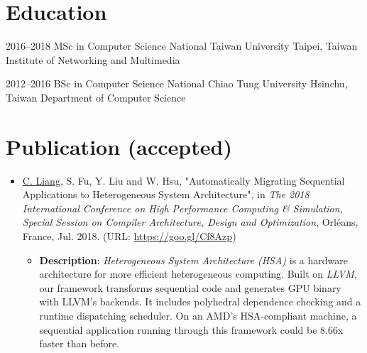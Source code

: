 \documentclass[11pt,a4paper,sans,english]{moderncv}
\begin{document}

\makecvtitle

\section{Education}
    \cventry
        {2016--2018} %
        {MSc in Computer Science} %
        {National Taiwan University} %
        {Taipei, Taiwan} %
        {Institute of Networking and Multimedia} %
        {}

    \cventry
        {2012--2016}
        {BSc in Computer Science}
        {National Chiao Tung University}
        {Hsinchu, Taiwan}
        {Department of Computer Science}
        {%
        }
        
\section{Publication (accepted)}
    \begin{itemize}
    \item \underline{C. Liang}, S. Fu, Y. Liu and W. Hsu, "Automatically Migrating Sequential Applications to Heterogeneous System Architecture", in \textit{The 2018 International Conference on High Performance Computing \& Simulation, Special Session on Compiler Architecture, Design and Optimization}, Orléans, France, Jul. 2018. (URL: \href{https://goo.gl/Cf8Azp}{https://goo.gl/Cf8Azp})
        \begin{itemize}
        \item \textbf{Description}: \textit{Heterogeneous System Architecture (HSA)} is a hardware architecture for more efficient heterogeneous computing. Built on \textit{LLVM}, our framework transforms sequential code and generates GPU binary with LLVM's backends. It includes polyhedral dependence checking and a runtime dispatching scheduler. On an AMD's HSA-compliant machine, a sequential application running through this framework could be 8.66x faster than before.
        \end{itemize}
    \end{itemize}
    
\end{document}
